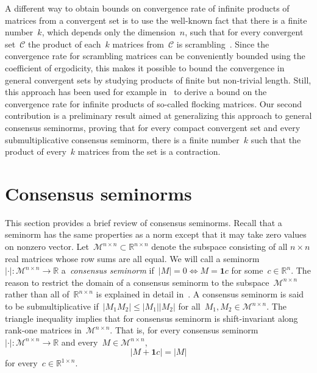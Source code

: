 \documentclass[letterpaper, 10 pt, conference]{ieeeconf}  %
\newcommand{\R}{\mathbb R}
\newcommand{\gensn}[1]{|#1|} %
\newcommand{\eqrowsum}{\mathcal{M}} %
\begin{document}
A different way to obtain bounds on convergence rate of infinite products of matrices from a convergent set is to use the well-known fact that there is a finite number~$k$, which depends only the dimension~$n$, such that for every convergent set~$\mathcal{C}$ the product of each~$k$ matrices from~$\mathcal{C}$ is scrambling~\cite{Wolfowitz1963SIA}. Since the convergence rate for scrambling matrices can be conveniently bounded using the coefficient of ergodicity, this makes it possible to bound the convergence in general convergent sets by studying products of finite but non-trivial length. Still, this approach has been used for example in~\cite{Cao2008ConsensusRate} to derive a bound on the convergence rate for infinite products of so-called flocking matrices. Our second contribution is a preliminary result aimed at generalizing this approach to general consensus seminorms, proving that for every compact convergent set and every submultiplicative consensus seminorm, there is a finite number~$k$ such that the product of every~$k$ matrices from the set is a contraction.

\section{Consensus seminorms}

This section provides a brief review of consensus seminorms. Recall that a seminorm has the same properties as a norm except that it may take zero values on nonzero vector. Let~$\eqrowsum^{n \times n} \subset \R^{n \times n}$ denote the subspace consisting of all $n \times n$ real matrices whose row sums are all equal. We will call a seminorm~$\gensn{\cdot} : \eqrowsum^{n \times n} \to \R$ a~\emph{consensus seminorm} if~$\gensn{M} = 0 \iff M = \mathbf{1}c$ for some~$c \in \R^n$. The reason to restrict the domain of a consensus seminorm to the subspace~$\eqrowsum^{n \times n}$ rather than all of~$\R^{n \times n}$ is explained in detail in~\cite{Ofir2025ConsensusSeminorms}. A consensus seminorm is said to be submultiplicative if~$\gensn{M_1 M_2} \le \gensn{M_1} \gensn{M_2}$ for all~$M_1,M_2 \in \eqrowsum^{n \times n}$. The triangle inequality implies that for consensus seminorm is shift-invariant along rank-one matrices in~$\eqrowsum^{n \times n}$. That is, for every consensus seminorm~$\gensn{\cdot}:\eqrowsum^{n \times n} \to \R$ and every~$M \in \eqrowsum^{n \times n}$,
\begin{equation}\label{eq:shift}
    \gensn{M + \mathbf{1}c} = \gensn{M}
\end{equation}
for every~$c \in \R^{1 \times n}$.
\end{document}

